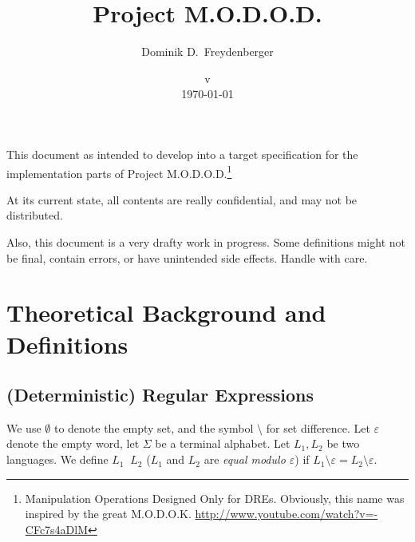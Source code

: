 \documentclass[a4paper,11pt, svgnames,titlepage]{article}
\date{v\svnfilerev\\ \today}
\title{Project M.O.D.O.D.}
\author{Dominik D.\ Freydenberger}
\DeclareMathOperator{\eqModEw}{=_{\emptyword}}
\newcommand{\emptyword}{\varepsilon}
\begin{document}
\maketitle
\pagestyle{fancy}

This document as intended to develop into a target specification for the implementation parts of Project M.O.D.O.D.\footnote{Manipulation Operations Designed Only for DREs. Obviously, this name was inspired by the great M.O.D.O.K. \url{http://www.youtube.com/watch?v=-CFc7s4aDlM}}

At its current state, all contents are really confidential, and may not be distributed.

Also, this document is a very drafty work in progress. Some definitions might not be final, contain errors, or have unintended side effects. Handle with care.
\section{Theoretical Background and Definitions}

\subsection{(Deterministic) Regular Expressions}\label{sec:dredef}
We use $\emptyset$ to denote the empty set, and the symbol $\setminus$ for set difference. Let $\emptyword$ denote the empty word, let $\Sigma$ be a terminal alphabet. Let $L_1,L_2$ be two languages. We define $L_1\eqModEw L_2$ ($L_1$ and $L_2$ are \emph{equal modulo $\emptyword$}) if $L_1\setminus\emptyword=L_2\setminus\emptyword$.
\end{document}
